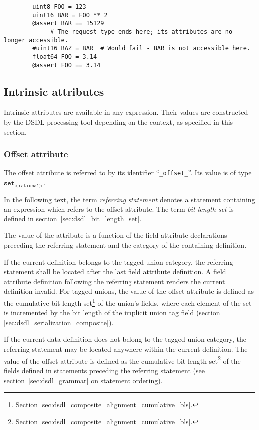\begin{remark}
    \begin{verbatim}
        uint8 FOO = 123
        uint16 BAR = FOO ** 2
        @assert BAR == 15129
        ---  # The request type ends here; its attributes are no longer accessible.
        #uint16 BAZ = BAR  # Would fail - BAR is not accessible here.
        float64 FOO = 3.14
        @assert FOO == 3.14
    \end{verbatim}
\end{remark}

\subsection{Intrinsic attributes}

Intrinsic attributes are available in any expression.
Their values are constructed by the DSDL processing tool depending on the context,
as specified in this section.

\subsubsection{Offset attribute}

The offset attribute is referred to by its identifier ``\verb|_offset_|''.
Its value is of type $\texttt{set}_\texttt{<rational>}$.

In the following text, the term \emph{referring statement} denotes a statement
containing an expression which refers to the offset attribute.
The term \emph{bit length set} is defined in section~\ref{sec:dsdl_bit_length_set}.

The value of the attribute is a function of the field attribute declarations preceding the referring statement
and the category of the containing definition.

If the current definition belongs to the tagged union category,
the referring statement shall be located after the last field attribute definition.
A field attribute definition following the referring statement renders the current definition invalid.
For tagged unions, the value of the offset attribute is defined as the
cumulative bit length set\footnote{Section \ref{sec:dsdl_composite_alignment_cumulative_bls}.}
of the union's fields, where each element of the set is incremented by the bit length of the implicit union tag field
(section \ref{sec:dsdl_serialization_composite}).

If the current data definition does not belong to the tagged union category,
the referring statement may be located anywhere within the current definition.
The value of the offset attribute is defined as the
cumulative bit length set\footnote{Section \ref{sec:dsdl_composite_alignment_cumulative_bls}.}
of the fields defined in statements preceding the referring statement
(see section~\ref{sec:dsdl_grammar} on statement ordering).

